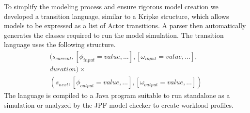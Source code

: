 To simplify the modeling process and ensure rigorous model creation we
developed a transition language, similar to a Kripke structure, which allows
models to be expressed as a list of Actor transitions.  A parser then
automatically generates the classes required to run the model simulation.
The transition language uses the following structure.
\begin{equation}
\begin{split}
(s_{current}, [\phi_{input} = value,\ldots], [\omega_{input} = value,\ldots],\\
duration) \times \\
(s_{next}, [\phi_{output} =
value,\ldots], [\omega_{output} = value,\ldots])
\end{split}
\end{equation}
\noindent The language is compiled to a Java program suitable to run standalone
as a simulation or analyzed by the JPF model checker to create
workload profiles.
